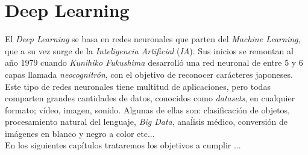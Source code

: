 \section{Deep Learning}
\label{sec:deeplearning}
El \textit{Deep Learning} se basa en redes neuronales que parten del \textit{Machine Learning}, que a su vez surge de la \textit{Inteligencia Artificial} (\textit{IA}). Sus inicios se remontan al año 1979 cuando \textit{Kunihiko Fukushima} desarrolló una red neuronal de entre 5 y 6 capas llamada \textit{neocognitrón}\cite{neocognitron}, con el objetivo de reconocer carácteres japoneses.\\

Este tipo de redes neuronales tiene multitud de aplicaciones, pero todas comparten grandes cantidades de datos, conocidos como \textit{datasets}, en cualquier formato; vídeo, imagen, sonido. Algunas de ellas son: clasificación de objetos, procesamiento natural del lenguaje, \textit{Big Data}, anaĺisis médico, conversión de imágenes en blanco y negro a color etc...\\

En los siguientes capítulos trataremos los objetivos a cumplir ...\\
